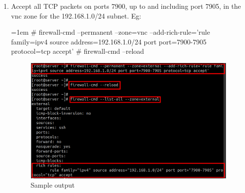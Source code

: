 \begin{flushleft}
\begin{itemize}
\begin{enumerate}
		\newpage
		\item Accept all TCP packets on ports 7900, up to and including port 7905, in the vnc zone for the 192.168.1.0/24 subnet.
		\newline
		Eg:
		\begin{tcolorbox}[breakable,notitle,boxrule=-0pt,colback=black,colframe=black]
			\color{green}
			\font=1em
			\# firewall-cmd --permanent --zone=vnc --add-rich-rule='rule family=ipv4 source address=192.168.1.0/24 port port=7900-7905 protocol=tcp accept'
			\newline
			\newline
			\# firewall-cmd --reload
			\font=4pt
		\end{tcolorbox}
		
		\begin{figure}[h!]
			\centering
			\includegraphics[scale=.3]{content/chapter2/images/zones12.png}
			\caption{Sample output}
			\label{fig:command_prompt10}
		\end{figure}
		
	\end{enumerate}

	\end{itemize}
	
\end{flushleft}

\newpage

